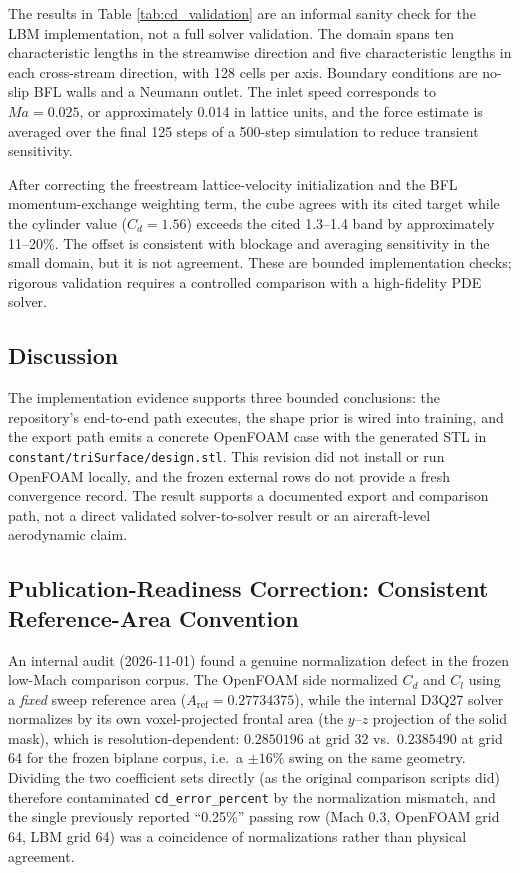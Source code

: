 The results in Table \ref{tab:cd_validation} are an informal sanity check for the LBM implementation, not a full solver validation. The domain spans ten characteristic lengths in the streamwise direction and five characteristic lengths in each cross-stream direction, with 128 cells per axis. Boundary conditions are no-slip BFL walls and a Neumann outlet. The inlet speed corresponds to \(Ma=0.025\), or approximately 0.014 in lattice units, and the force estimate is averaged over the final 125 steps of a 500-step simulation to reduce transient sensitivity.

After correcting the freestream lattice-velocity initialization and the BFL momentum-exchange weighting term, the cube agrees with its cited target while the cylinder value ($C_d=1.56$) exceeds the cited 1.3--1.4 band by approximately 11--20\%. The offset is consistent with blockage and averaging sensitivity in the small domain, but it is not agreement. These are bounded implementation checks; rigorous validation requires a controlled comparison with a high-fidelity PDE solver.

\subsection{Discussion}
The implementation evidence supports three bounded conclusions: the repository's end-to-end path executes, the shape prior is wired into training, and the export path emits a concrete OpenFOAM case with the generated STL in \texttt{constant/triSurface/design.stl}. This revision did not install or run OpenFOAM locally, and the frozen external rows do not provide a fresh convergence record. The result supports a documented export and comparison path, not a direct validated solver-to-solver result or an aircraft-level aerodynamic claim.

\subsection{Publication-Readiness Correction: Consistent Reference-Area Convention}
\label{sec:reference_area_correction}
An internal audit (2026-11-01) found a genuine normalization defect in the frozen low-Mach comparison corpus. The OpenFOAM side normalized $C_d$ and $C_l$ using a \emph{fixed} sweep reference area (\(A_{\mathrm{ref}} = 0.27734375\)), while the internal D3Q27 solver normalizes by its own voxel-projected frontal area (the $y$--$z$ projection of the solid mask), which is resolution-dependent: \(0.2850196\) at grid 32 vs.\ \(0.2385490\) at grid 64 for the frozen biplane corpus, i.e.\ a \(\pm 16\%\) swing on the same geometry. Dividing the two coefficient sets directly (as the original comparison scripts did) therefore contaminated \texttt{cd\_error\_percent} by the normalization mismatch, and the single previously reported ``0.25\%'' passing row (Mach 0.3, OpenFOAM grid 64, LBM grid 64) was a coincidence of normalizations rather than physical agreement.

